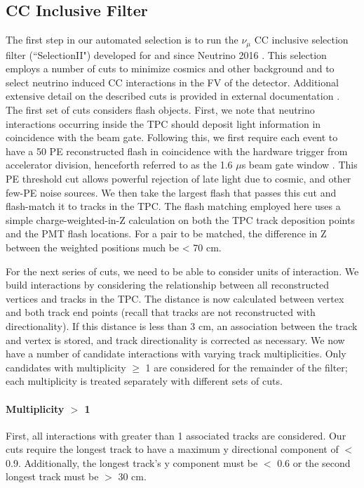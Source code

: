 \documentclass[12pt]{article}
\begin{document}
\subsection{CC Inclusive Filter} The first step in our automated selection is to run the $\nu_\mu$ CC inclusive selection filter (``SelectionII") developed for and since Neutrino 2016 \cite{bib:numucc}.  This selection employs a number of cuts to minimize cosmics and other background and to select neutrino induced CC interactions in the FV of the detector. Additional extensive detail on the described cuts is provided in external documentation \cite{bib:numucc}.  
\noindent The first set of cuts considers flash objects.  First, we note that neutrino interactions occurring inside the TPC should deposit light information in coincidence with the beam gate. Following this, we first require each event to have a 50 PE reconstructed flash in coincidence with the hardware trigger from accelerator division, henceforth referred to as the 1.6 $\mu$s beam gate window \cite{bib:first_nus}. This PE threshold cut allows powerful rejection of late light due to cosmic, and other few-PE noise sources. We then take the largest flash that passes this cut and flash-match it to tracks in the TPC.  The flash matching employed here uses a simple charge-weighted-in-Z calculation on both the TPC track deposition points and the PMT flash locations. For a pair to be matched, the difference in Z between the weighted positions much be < 70 cm. 
\par For the next series of cuts, we need to be able to consider units of interaction. We build interactions by considering the relationship between all reconstructed vertices and tracks in the TPC. The distance is now calculated between vertex and both track end points (recall that tracks are not reconstructed with directionality). If this distance is less than 3 cm, an association between the track and vertex is stored, and track directionality is corrected as necessary. We now have a number of candidate interactions with varying track multiplicities.  Only candidates with multiplicity $\geq$ 1 are considered for the remainder of the filter; each multiplicity is treated separately with different sets of cuts.
\paragraph{Multiplicity $>$ 1}
\par First, all interactions with greater than 1 associated tracks are considered. Our cuts require the longest track to have a maximum y directional component of $<$ 0.9.  Additionally, the longest track's y component must be $<$ 0.6 or the second longest track must be $>$ 30 cm.
\end{document}
